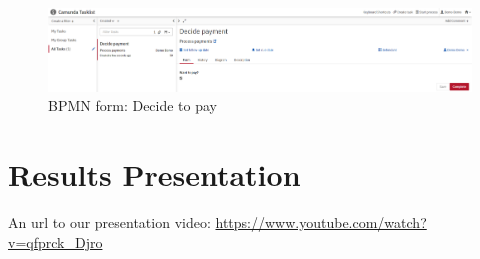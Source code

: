 \begin{landscape}
        \begin{figure}[h]\centering
            \includegraphics[width=22cm]{pic/camunda4}
            \caption{BPMN form: Decide to pay}
            \label{fig:camunda4}
        \end{figure}
    
    \end{landscape}

\section{Results Presentation}\label{sec:presentation}

An url to our presentation video: \url{https://www.youtube.com/watch?v=qfprck_Djro}
